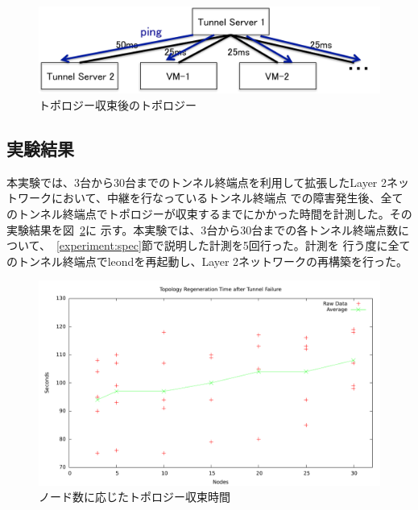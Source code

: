 \begin{figure}
	\begin{center}
		\includegraphics[scale=0.70]{./img/topologyat1b}
		\caption{トポロジー収束後のトポロジー}
		\label{img:topologyat1b}
	\end{center}
\end{figure}

\subsection{実験結果}
\label{experiment:result}

本実験では、3台から30台までのトンネル終端点を利用して拡張したLayer 2ネットワークにおいて、中継を行なっているトンネル終端点
での障害発生後、全てのトンネル終端点でトポロジーが収束するまでにかかった時間を計測した。その実験結果を図~\ref{graph:topology}に
示す。本実験では、3台から30台までの各トンネル終端点数について、~\ref{experiment:spec}節で説明した計測を5回行った。計測を
行う度に全てのトンネル終端点でleondを再起動し、Layer 2ネットワークの再構築を行った。

\begin{figure}
	\begin{center}
		\includegraphics[scale=0.80]{./img/topology}
		\caption{ノード数に応じたトポロジー収束時間}
		\label{graph:topology}
	\end{center}
\end{figure}

